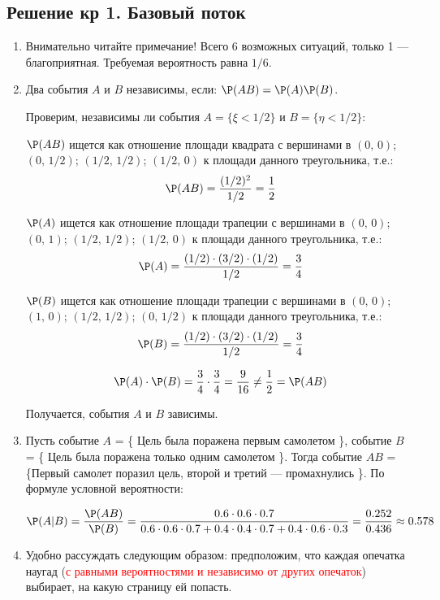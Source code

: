 \subsection{Решение кр 1. Базовый поток}
\begin{enumerate}
\item Внимательно читайте примечание! Всего 6 возможных ситуаций, только 1 — благоприятная.
Требуемая вероятность равна $1/6$.

\item
Два события $A$ и $B$ независимы, если: $\P(AB) = \P(A) \P(B)$.

Проверим, независимы ли события $A = \{ \xi < 1/2 \} $ и  $B = \{ \eta < 1/2 \} $:

$\P(AB)$ ищется как отношение площади квадрата с вершинами в $(0,\,0)$; $(0,\,1/2)$; $(1/2,\,1/2)$; $(1/2,\,0)$ к площади данного треугольника, т.е.:
\[
\P(AB) = \frac{(1/2)^2}{1/2}= \frac{1}{2}
\]

$\P(A)$ ищется как отношение площади трапеции с вершинами в $(0,\,0)$; $(0,\,1)$; $(1/2,\,1/2)$; $(1/2,\,0)$ к площади данного треугольника, т.е.:
\[
\P(A) = \frac{(1/2)\cdot (3/2) \cdot (1/2)}{1/2}= \frac{3}{4}
\]

$\P(B)$ ищется как отношение площади трапеции с вершинами в $(0,\,0)$; $(1,\,0)$; $(1/2,\,1/2)$; $(0,\,1/2)$ к площади данного треугольника, т.е.:
\[
\P(B) = \frac{(1/2)\cdot (3/2) \cdot (1/2)}{1/2}= \frac{3}{4}
\]

\[
\P(A)\cdot \P(B) = \frac{3}{4} \cdot  \frac{3}{4} = \frac{9}{16} \ne \frac{1}{2} = \P(AB)
\]

Получается, события $A$ и $B$ зависимы.

\item
Пусть событие $A$ = \{ Цель была поражена первым самолетом \}, событие $B$ = \{ Цель была поражена только одним самолетом \}. Тогда событие $AB$ = \{Первый самолет поразил цель, второй и третий — промахнулись  \}. По формуле условной вероятности:

\[\P(A|B) = \frac{\P(AB)}{\P(B)} = \frac{0.6 \cdot 0.6 \cdot 0.7}{0.6\cdot 0.6 \cdot 0.7 + 0.4 \cdot 0.4 \cdot 0.7 + 0.4 \cdot 0.6 \cdot 0.3} = \frac{0.252}{0.436} \approx 0.578\]

\item
Удобно рассуждать следующим образом: предположим, что каждая опечатка наугад (\textcolor{red}{с равными вероятностями и независимо от других опечаток}) выбирает, на какую страницу ей попасть.



\end{enumerate}
